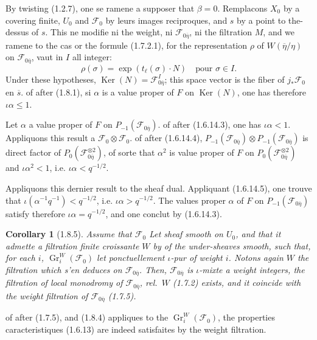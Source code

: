 \documentclass[12pt,a4paper]{article}
\theoremstyle{plain}
\newtheorem{corollary}[theorem]{Corollary}
\theoremstyle{definition}
\theoremstyle{definition}
\theoremstyle{remark}
\DeclareMathOperator{\Gr}{Gr}
\DeclareMathOperator{\Ker}{Ker}
\begin{document}
By twisting (1.2.7), one se ramene a supposer that $\beta = 0$. Remplacons $X_0$ by a covering finite, $U_0$ and $\mathscr{F}_0$ by leurs images reciproques, and $s$ by a point to the-dessus of $s$. This ne modifie ni the weight, ni $\mathscr{F}_{0\overline{\eta}}$, ni the filtration $M$, and we ramene to the cas or the formule (1.7.2.1), for the representation $\rho$ of $W(\overline{\eta}/\eta)$ on $\mathscr{F}_{0\overline{\eta}}$, vaut in $I$ all integer:
\[\rho(\sigma) = \exp(t_\ell(\sigma) \cdot N) \quad \text{pour } \sigma \in I.\]
Under these hypotheses, $\Ker(N) = \mathscr{F}_{0\overline{\eta}}^{I}$; this space vector is the fiber of $j_* \mathscr{F}_0$ en $\overline{s}$. of after (1.8.1), si $\alpha$ is a value proper of $F$ on $\Ker(N)$, one has therefore $\iota\alpha \leq 1$.

Let $\alpha$ a value proper of $F$ on $P_{-1}(\mathscr{F}_{0\overline{\eta}})$. of after (1.6.14.3), one has $\iota\alpha < 1$. Appliquons this result a $\mathscr{F}_0 \otimes \mathscr{F}_0$. of after (1.6.14.4), $P_{-1}(\mathscr{F}_{0\overline{\eta}}) \otimes P_{-1}(\mathscr{F}_{0\overline{\eta}})$ is direct factor of $P_0(\mathscr{F}_{0\overline{\eta}}^{\otimes 2})$, of sorte that $\alpha^2$ is value proper of $F$ on $P_0(\mathscr{F}_{0\overline{\eta}}^{\otimes 2})$ and $\iota\alpha^2 < 1$, i.e. $\iota\alpha < q^{-1/2}$.

Appliquons this dernier result to the sheaf dual. Appliquant (1.6.14.5), one trouve that $\iota(\alpha^{-1} q^{-1}) < q^{-1/2}$, i.e. $\iota\alpha > q^{-1/2}$. The values proper $\alpha$ of $F$ on $P_{-1}(\mathscr{F}_{0\overline{\eta}})$ satisfy therefore $\iota\alpha = q^{-1/2}$, and one conclut by (1.6.14.3).

\begin{corollary}[1.8.5]
Assume that $\mathscr{F}_0$ Let sheaf smooth on $U_0$, and that it admette a filtration finite croissante $W$ by of the under-sheaves smooth, such that, for each $i$, $\Gr_i^W(\mathscr{F}_0)$ let ponctuellement $\iota$-pur of weight $i$. Notons again $W$ the filtration which s'en deduces on $\mathscr{F}_{0\overline{\eta}}$. Then, $\mathscr{F}_{0\overline{\eta}}$ is $\iota$-mixte a weight integers, the filtration of local monodromy of $\mathscr{F}_{0\overline{\eta}}$, rel.~$W$ (1.7.2) exists, and it coincide with the weight filtration of $\mathscr{F}_{0\overline{\eta}}$ (1.7.5).
\end{corollary}

of after (1.7.5), and (1.8.4) appliques to the $\Gr_i^W(\mathscr{F}_0)$, the properties caracteristiques (1.6.13) are indeed satisfaites by the weight filtration.
\end{document}
